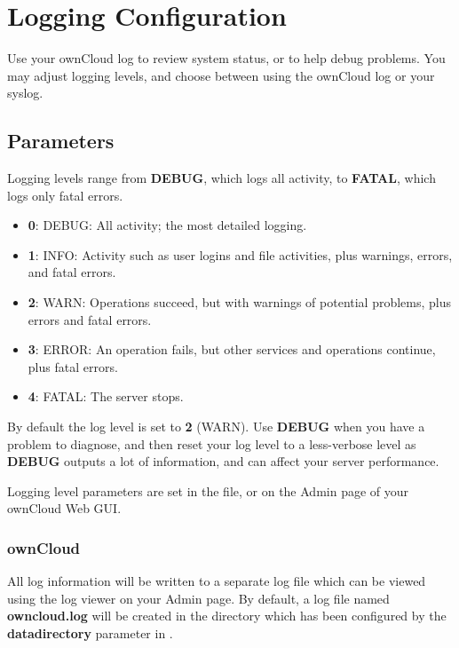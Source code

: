 \documentclass[letterpaper,10pt,english]{sphinxmanual}
\begin{document}
\section{Logging Configuration}
\label{configuration_server/logging_configuration::doc}\label{configuration_server/logging_configuration:logging-configuration}
Use your ownCloud log to review system status, or to help debug problems. You may adjust logging levels, and choose between using the ownCloud log or your syslog.


\subsection{Parameters}
\label{configuration_server/logging_configuration:parameters}
Logging levels range from \textbf{DEBUG}, which logs all activity, to \textbf{FATAL}, which logs only fatal errors.
\begin{itemize}
\item {} 
\textbf{0}: DEBUG: All activity; the most detailed logging.

\item {} 
\textbf{1}: INFO:  Activity such as user logins and file activities, plus warnings, errors, and fatal errors.

\item {} 
\textbf{2}: WARN:  Operations succeed, but with warnings of potential problems, plus errors and fatal errors.

\item {} 
\textbf{3}: ERROR: An operation fails, but other services and operations continue, plus fatal errors.

\item {} 
\textbf{4}: FATAL: The server stops.

\end{itemize}

By default the log level is set to \textbf{2} (WARN). Use \textbf{DEBUG} when you have a problem to diagnose, and then reset your log level to a less-verbose level as \textbf{DEBUG} outputs a lot of information, and can affect your server performance.

Logging level parameters are set in the  file, or on the Admin page of your ownCloud Web GUI.


\subsubsection{ownCloud}
\label{configuration_server/logging_configuration:owncloud}
All log information will be written to a separate log file which can be
viewed using the log viewer on your Admin page. By default, a log
file named \textbf{owncloud.log} will be created in the directory which has
been configured by the \textbf{datadirectory} parameter in .
\end{document}

